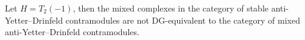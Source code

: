 \begin{prop}
Let $H=T_2(-1)$, then the mixed complexes in the category of stable anti-Yetter--Drinfeld contramodules are not DG-equivalent to the category of mixed anti-Yetter--Drinfeld contramodules.
\end{prop}
